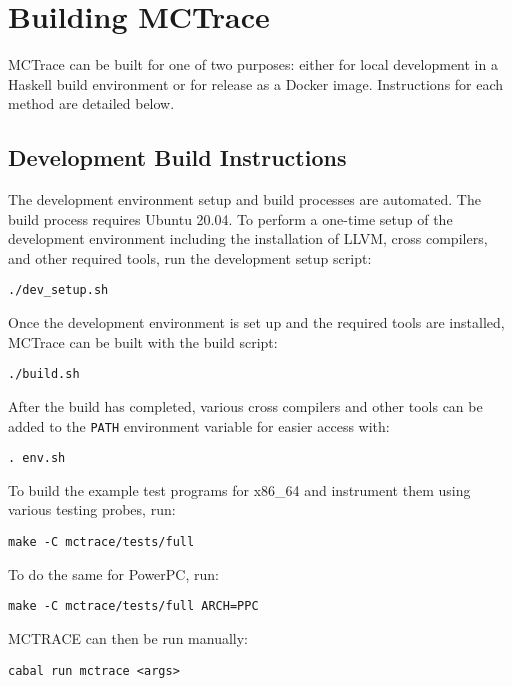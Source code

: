 
\section{Building MCTrace}
\label{sec:building-mctrace}

MCTrace can be built for one of two purposes: either for local
development in a Haskell build environment or for release as a Docker
image. Instructions for each method are detailed below.

\subsection{Development Build Instructions}
\label{sec:devel-build-instr}

The development environment setup and build processes are automated.
The build process requires Ubuntu 20.04. To perform a one-time setup of
the development environment including the installation of LLVM, cross
compilers, and other required tools, run the development setup script:

\begin{verbatim}
./dev_setup.sh
\end{verbatim}

Once the development environment is set up and the required tools are
installed, MCTrace can be built with the build script:

\begin{verbatim}
./build.sh
\end{verbatim}

After the build has completed, various cross compilers and other tools
can be added to the \texttt{PATH} environment variable for easier access with:

\begin{verbatim}
. env.sh
\end{verbatim}

To build the example test programs for x86\_64 and instrument them
using various testing probes, run:

\begin{verbatim}
make -C mctrace/tests/full
\end{verbatim}

To do the same for PowerPC, run:

\begin{verbatim}
make -C mctrace/tests/full ARCH=PPC
\end{verbatim}

MCTRACE can then be run manually:

\begin{verbatim}
cabal run mctrace <args>
\end{verbatim}

